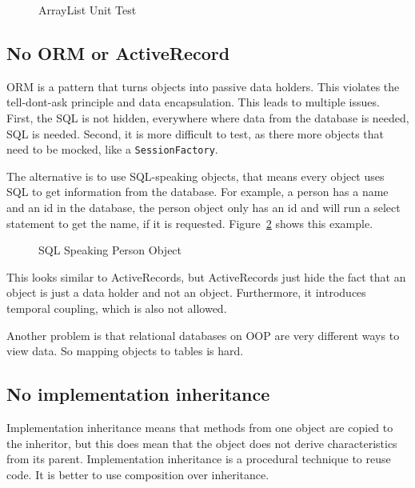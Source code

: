 \begin{figure}[h]
    \caption{ArrayList Unit Test}
    
    \label{fig:arraylist-unit-test}
\end{figure}

\subsection{No ORM or ActiveRecord}\label{subsec:no-orm-or-activerecord}
ORM is a pattern that turns objects into passive data holders.
This violates the tell-dont-ask principle and data encapsulation.
This leads to multiple issues.
First, the SQL is not hidden, everywhere where data from the database is needed, SQL is needed.
Second, it is more difficult to test, as there more objects that need to be mocked, like a \texttt{SessionFactory}.

The alternative is to use SQL-speaking objects, that means every object uses SQL to get information from the database.
For example, a person has a name and an id in the database, the person object only has an id and will run a select statement to get the name, if it is requested.
Figure\ \ref{fig:sql-speaking-person-object} shows this example.

\begin{figure}[h]
    \caption{SQL Speaking Person Object}
    
    \label{fig:sql-speaking-person-object}
\end{figure}

This looks similar to ActiveRecords, but ActiveRecords just hide the fact that an object is just a data holder and not an object.
Furthermore, it introduces temporal coupling, which is also not allowed.

Another problem is that relational databases on \Gls{OOP} are very different ways to view data.
So mapping objects to tables is hard.\cite{orm-vietnam-of-cs,tell-dont-ask-martin-fowler,elegant-objects}

\subsection{No implementation inheritance}\label{subsec:no-implementation-inheritance}
Implementation inheritance means that methods from one object are copied to the inheritor, but this does mean that the object does not derive characteristics from its parent.
Implementation inheritance is a procedural technique to reuse code.
It is better to use composition over inheritance.\cite{elegant-objects}